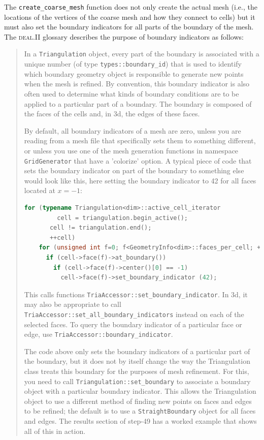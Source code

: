 \documentclass{article}
\newcommand{\dealii}{{\textsc{deal.II}}}
\begin{document}
The \texttt{create\_coarse\_mesh} function does not only create the actual
mesh (i.e., the locations of the vertices of the coarse mesh and how they
connect to cells) but it must also set the boundary indicators for all parts
of the boundary of the mesh. The \dealii{} glossary describes the purpose of
boundary indicators as follows:
\begin{quote}
  In a \texttt{Triangulation} object, every part of the boundary is associated with
  a unique number (of type \texttt{types::boundary\_id}) that is used to identify which
  boundary geometry object is responsible to generate new points when the mesh
  is refined. By convention, this boundary indicator is also often used to
  determine what kinds of boundary conditions are to be applied to a particular
  part of a boundary. The boundary is composed of the faces of the cells and, in 3d,
  the edges of these faces.

  By default, all boundary indicators of a mesh are zero, unless you are
  reading from a mesh file that specifically sets them to something different,
  or unless you use one of the mesh generation functions in namespace \texttt{GridGenerator}
  that have a 'colorize' option. A typical piece of code that sets the boundary
  indicator on part of the boundary to something else would look like
  this, here setting the boundary indicator to 42 for all faces located at
  $x=-1$:
  \begin{lstlisting}[frame=single,language=C++]
  for (typename Triangulation<dim>::active_cell_iterator
         cell = triangulation.begin_active();
       cell != triangulation.end();
       ++cell)
    for (unsigned int f=0; f<GeometryInfo<dim>::faces_per_cell; ++f)
      if (cell->face(f)->at_boundary())
        if (cell->face(f)->center()[0] == -1)
          cell->face(f)->set_boundary_indicator (42);
  \end{lstlisting}
  This calls functions \texttt{TriaAccessor::set\_boundary\_indicator}. In 3d, it may
  also be appropriate to call \texttt{TriaAccessor::set\_all\_boundary\_indicators} instead
  on each of the selected faces. To query the boundary indicator of a particular
  face or edge, use \texttt{TriaAccessor::boundary\_indicator}.

  The code above only sets the boundary indicators of a particular part
  of the boundary, but it does not by itself change the way the Triangulation
  class treats this boundary for the purposes of mesh refinement. For this,
  you need to call \texttt{Triangulation::set\_boundary} to associate a boundary
  object with a particular boundary indicator. This allows the Triangulation
  object to use a different method of finding new points on faces and edges
  to be refined; the default is to use a \texttt{StraightBoundary} object for all
  faces and edges. The results section of step-49 has a worked example that
  shows all of this in action.


\end{quote}
\end{document}
